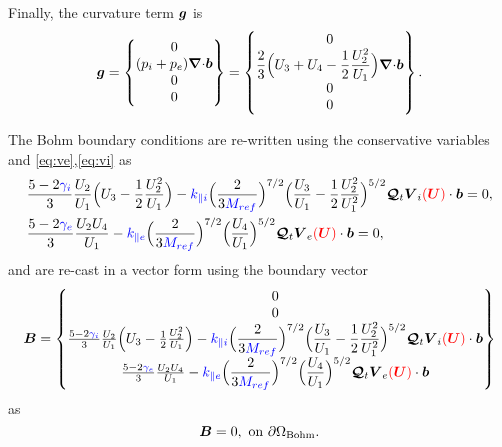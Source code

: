 \documentclass[a4paper,10pt]{article}
\newcommand{\bm}[1]{\text{\boldmath$#1$\unboldmath}}
\newcommand{\Div}{{\bm{\nabla}\cdot}}
\renewcommand{\b}{\bm{b}}
\newcommand{\DiscFunc}[1]{\bm{#1}}
\newcommand{\SecOrdTens}[1]{\bm{\mathcal{#1}}}
\renewcommand{\u}{\DiscFunc{U}}
\newcommand{\G}{\SecOrdTens{Q}}
\newcommand{\Gt}{\G_t}
\newcommand{\B}{\bm{B}}
\newcommand{\nd}[1]{{\color{blue} #1\color{black}}} %
\newcommand{\fo}[1]{{ \color{red} ( #1 )\color{black} }} %
\def\Mref{\nd{M_{ref}}}
\def\kpai{\nd{k_{\parallel i}}}
\def\kpae{\nd{k_{\parallel e}}}
\begin{document}
Finally, the curvature term $\bm{g}$ is 
\begin{equation*}
  \bm{g} = \begin{Bmatrix}
                     0 \\                    
                     (p_i+p_e)\Div \b \\
                     0  \\
                     0
            \end{Bmatrix} = 
            \begin{Bmatrix}
                     0 \\                    
                     \dfrac{2}{3}\Big(U_3+U_4 -\dfrac{1}{2}\dfrac{U_2^2}{U_1}\Big)\Div \b \\
                     0 \\
                     0
            \end{Bmatrix}.
\end{equation*}

The Bohm boundary conditions are re-written using the conservative variables and \eqref{eq:ve},\eqref{eq:vi} as 
\begin{equation*}
 \begin{aligned}
 &\frac{5-2\nd{\gamma_i}}{3}\frac{U_2}{U_1}\Big( U_3 - \frac{1}{2}\frac{U_2^2}{U_1} \Big)-\kpai \Big(\dfrac{2}{3 \Mref}\Big)^{7/2}\Big(\dfrac{U_3}{U_1}- \dfrac{1}{2}\dfrac{U_2^2}{U_1^2}\Big)^{5/2}\Gt  \bm{V}_i\fo{\u} \cdot \b= 0,\\
  & \frac{5-2\nd{\gamma_e}}{3}\frac{U_2 U_4}{U_1}- \kpae \Big(\dfrac{2}{3 \Mref}\Big)^{7/2}\Big(\dfrac{U_4}{U_1}\Big)^{5/2}\Gt  \bm{V}_e\fo{\u} \cdot \b  = 0,
 \end{aligned}
\end{equation*}
and are re-cast in a vector form using the boundary vector 
\begin{equation*}
  \B = \begin{Bmatrix}
                     0 \\                    
                     0\\
                     \frac{5-2\nd{\gamma_i}}{3}\frac{U_2}{U_1}\Big( U_3 - \frac{1}{2}\frac{U_2^2}{U_1} \Big)-\kpai \Big(\dfrac{2}{3 \Mref}\Big)^{7/2}\Big(\dfrac{U_3}{U_1}- \dfrac{1}{2}\dfrac{U_2^2}{U_1^2}\Big)^{5/2}\Gt  \bm{V}_i\fo{\u} \cdot \b  \\
                     \frac{5-2\nd{\gamma_e}}{3}\frac{U_2 U_4}{U_1}- \kpae \Big(\dfrac{2}{3 \Mref}\Big)^{7/2}\Big(\dfrac{U_4}{U_1}\Big)^{5/2}\Gt  \bm{V}_e\fo{\u} \cdot \b
            \end{Bmatrix} 
\end{equation*}
as 
\begin{equation*}
 \B=0, \text{ on } \partial \Omega_{\text{Bohm}}.
\end{equation*}
\end{document}
